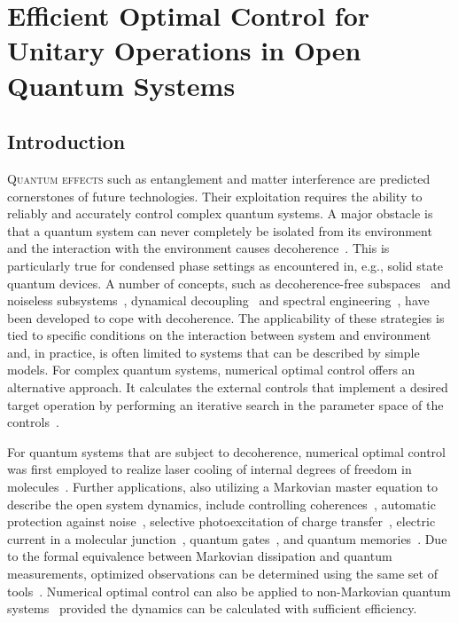 \chapter[Efficient OC for Unitary Operations in Open Quantum Systems]{Efficient Optimal Control for Unitary Operations in Open Quantum Systems}

\section{Introduction}
\label{sec:intro}

\lettrine[lines=2]{Q}{uantum effects}
such as entanglement and matter interference are
predicted cornerstones of future technologies. Their exploitation
requires the ability to reliably and accurately control complex
quantum systems. A major obstacle is that a quantum system
can never completely be isolated from its environment and the
interaction with the environment causes 
decoherence~\cite{BreuerBook}. This is particularly true for condensed
phase settings as encountered in, e.g., solid state quantum devices. 
A number of concepts, such as decoherence-free subspaces~\cite{LidarPRL98}
and noiseless subsystems~\cite{LorenzaSci01}, dynamical
decoupling~\cite{LorenzaPRL99} and spectral
engineering~\cite{ClausenPRL10}, have been developed to cope with 
decoherence. The applicability of these strategies is tied to specific
conditions on the interaction between system and environment and,
in practice, is often  limited to systems that can be described by simple
models. For complex quantum systems, numerical optimal control offers an
alternative approach. It calculates the external controls that
implement a desired target operation by performing an iterative search
in the parameter space of the controls~\cite{RiceBook}. 

For quantum systems that are subject to decoherence, numerical optimal
control was first employed 
to realize laser cooling of internal degrees of freedom in
molecules~\cite{BartanaJCP97}. Further applications, also utilizing a
Markovian master equation to describe the open system dynamics, 
include controlling coherences~\cite{OhtsukiJCP99}, automatic
protection against noise~\cite{KallushPRA06}, selective
photoexcitation of charge transfer~\cite{TremblayPRA08},
electric current in a molecular junction~\cite{KleinekathoeferEPJB10},
quantum gates~\cite{ToSHJPB11}, and 
quantum memories~\cite{GormanPRA12}. Due to the formal equivalence
between Markovian 
dissipation and quantum measurements, optimized observations can be
determined using the same set of tools~\cite{ShuangJCP07}. 
Numerical optimal control can also be applied to non-Markovian
quantum
systems~\cite{RebentrostPRL09,AsplundPRL11,SchmidtPRL11,FloetherNJP12} 
provided the dynamics can be calculated with sufficient efficiency. 

